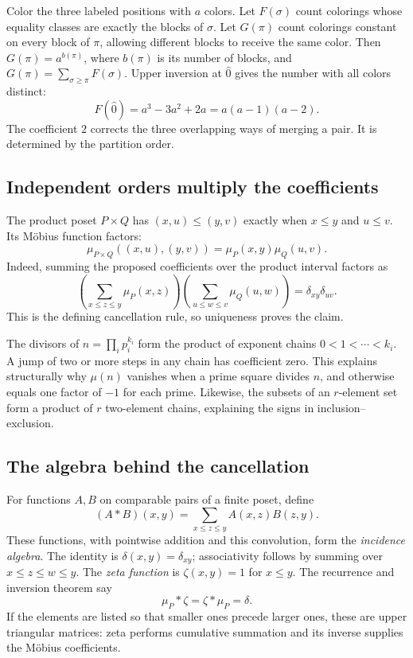 Color the three labeled positions with $a$ colors. Let $F(\sigma)$
count colorings whose equality classes are exactly the blocks of
$\sigma$. Let $G(\pi)$ count colorings constant on every block of
$\pi$, allowing different blocks to receive the same color.
Then $G(\pi)=a^{b(\pi)}$, where $b(\pi)$ is its number of blocks,
and $G(\pi)=\sum_{\sigma\ge\pi}F(\sigma)$.
Upper inversion at $\widehat0$ gives the number with all colors distinct:
\[
 F(\widehat0)=a^3-3a^2+2a=a(a-1)(a-2).
\]
The coefficient $2$ corrects the three overlapping ways of merging
a pair. It is determined by the partition order.

\subsection{Independent orders multiply the coefficients}

The product poset $P\times Q$ has
$(x,u)\le(y,v)$ exactly when $x\le y$ and $u\le v$.
Its M\"obius function factors:
\[
 \mu_{P\times Q}((x,u),(y,v))=\mu_P(x,y)\mu_Q(u,v).
\]
Indeed, summing the proposed coefficients over the product interval
factors as
\[
 \left(\sum_{x\le z\le y}\mu_P(x,z)\right)
 \left(\sum_{u\le w\le v}\mu_Q(u,w)\right)
 =\delta_{xy}\delta_{uv}.
\]
This is the defining cancellation rule, so uniqueness proves the claim.

The divisors of $n=\prod_i p_i^{k_i}$ form the product of exponent
chains $0<1<\cdots<k_i$. A jump of two or more steps in any chain
has coefficient zero. This explains structurally why $\mu(n)$
vanishes when a prime square divides $n$, and otherwise equals one
factor of $-1$ for each prime. Likewise, the subsets of an $r$-element
set form a product of $r$ two-element chains, explaining the signs
in inclusion--exclusion.

\subsection{The algebra behind the cancellation}

For functions $A,B$ on comparable pairs of a finite poset, define
\[
 (A*B)(x,y)=\sum_{x\le z\le y}A(x,z)B(z,y).
\]
These functions, with pointwise addition and this convolution, form
the \emph{incidence algebra}. The identity is $\delta(x,y)=\delta_{xy}$;
associativity follows by summing over $x\le z\le w\le y$.
The \emph{zeta function} is $\zeta(x,y)=1$ for $x\le y$.
The recurrence and inversion theorem say
\[
 \mu_P*\zeta=\zeta*\mu_P=\delta.
\]
If the elements are listed so that smaller ones precede larger ones,
these are upper triangular matrices: zeta performs cumulative summation
and its inverse supplies the M\"obius coefficients.


